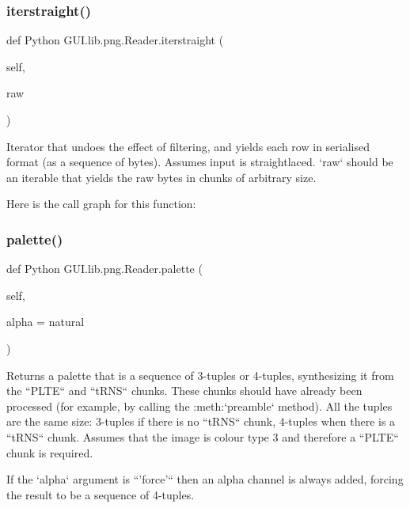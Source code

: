 \subsubsection{\texorpdfstring{iterstraight()}{iterstraight()}}
{\footnotesize\ttfamily def Python G\+U\+I.\+lib.\+png.\+Reader.\+iterstraight (\begin{DoxyParamCaption}\item[{}]{self,  }\item[{}]{raw }\end{DoxyParamCaption})}

\begin{DoxyVerb}Iterator that undoes the effect of filtering, and yields
each row in serialised format (as a sequence of bytes).
Assumes input is straightlaced.  `raw` should be an iterable
that yields the raw bytes in chunks of arbitrary size.
\end{DoxyVerb}
 Here is the call graph for this function\+:
\mbox{\label{class_python_01_g_u_i_1_1lib_1_1png_1_1_reader_a86dbd097935e19f48465cee11a5cdd8b}} 
\subsubsection{\texorpdfstring{palette()}{palette()}}
{\footnotesize\ttfamily def Python G\+U\+I.\+lib.\+png.\+Reader.\+palette (\begin{DoxyParamCaption}\item[{}]{self,  }\item[{}]{alpha = {\ttfamily \textquotesingle{}natural\textquotesingle{}} }\end{DoxyParamCaption})}

\begin{DoxyVerb}Returns a palette that is a sequence of 3-tuples or 4-tuples,
synthesizing it from the ``PLTE`` and ``tRNS`` chunks.  These
chunks should have already been processed (for example, by
calling the :meth:`preamble` method).  All the tuples are the
same size: 3-tuples if there is no ``tRNS`` chunk, 4-tuples when
there is a ``tRNS`` chunk.  Assumes that the image is colour type
3 and therefore a ``PLTE`` chunk is required.

If the `alpha` argument is ``'force'`` then an alpha channel is
always added, forcing the result to be a sequence of 4-tuples.
\end{DoxyVerb}
 \mbox{\label{class_python_01_g_u_i_1_1lib_1_1png_1_1_reader_a2112fb66cd97c180f2fc274b25695fa9}} 
